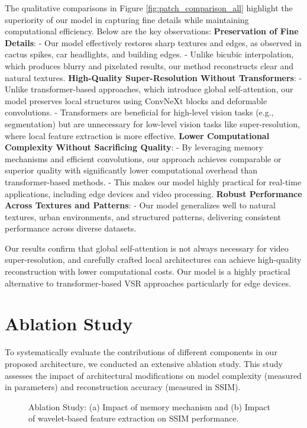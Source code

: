 \documentclass[11pt]{article}
\begin{document}
The qualitative comparisons in Figure \ref{fig:patch_comparison_all} highlight the superiority of our model in capturing fine details while maintaining computational efficiency. Below are the key observations:
\textbf{Preservation of Fine Details}:  
- Our model effectively restores sharp textures and edges, as observed in cactus spikes, car headlights, and building edges.
- Unlike bicubic interpolation, which produces blurry and pixelated results, our method reconstructs clear and natural textures.
\textbf{High-Quality Super-Resolution Without Transformers}:  
- Unlike transformer-based approaches, which introduce global self-attention, our model preserves local structures using ConvNeXt blocks and deformable convolutions.
- Transformers are beneficial for high-level vision tasks (e.g., segmentation) but are unnecessary for low-level vision tasks like super-resolution, where local feature extraction is more effective.
\textbf{Lower Computational Complexity Without Sacrificing Quality}:  
- By leveraging memory mechanisms and efficient convolutions, our approach achieves comparable or superior quality with significantly lower computational overhead than transformer-based methods.
- This makes our model highly practical for real-time applications, including edge devices and video processing.
\textbf{Robust Performance Across Textures and Patterns}:  
- Our model generalizes well to natural textures, urban environments, and structured patterns, delivering consistent performance across diverse datasets.

Our results confirm that global self-attention is not always necessary for video super-resolution, and carefully crafted local architectures can achieve high-quality reconstruction with lower computational costs. Our model is a highly practical alternative to transformer-based VSR approaches particularly for edge devices.



\section{Ablation Study}
\label{sec:ablation}
To systematically evaluate the contributions of different components in our proposed architecture, we conducted an extensive ablation study. This study assesses the impact of architectural modifications on model complexity (measured in parameters) and reconstruction accuracy (measured in SSIM). 

\begin{figure*}
    \centering
    \hfill
    \caption{Ablation Study: (a) Impact of memory mechanism and (b) Impact of wavelet-based feature extraction on SSIM performance.}
    \label{fig:ssim_ablation}
\end{figure*}
\end{document}
